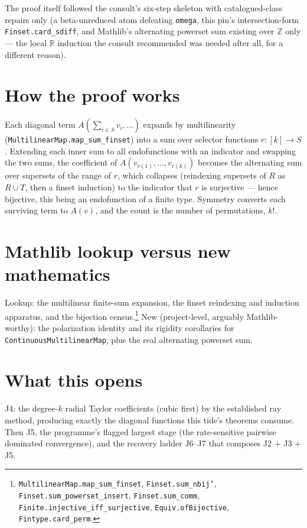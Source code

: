 \documentclass[11pt]{article}
\begin{document}
The proof itself followed the consult's six-step skeleton with
catalogued-class repairs only (a beta-unreduced atom defeating
\texttt{omega}, this pin's intersection-form
\texttt{Finset.card\_sdiff}, and Mathlib's alternating powerset sum
existing over $\mathbb{Z}$ only --- the local $\mathbb{R}$ induction
the consult recommended was needed after all, for a different
reason).

\section{How the proof works}

Each diagonal term $A(\sum_{i \in S} v_i, \dots)$ expands by
multilinearity (\texttt{MultilinearMap.map\_sum\_finset}) into a sum
over selector functions $r : [k] \to S$. Extending each inner sum to
all endofunctions with an indicator and swapping the two sums, the
coefficient of $A(v_{r(1)},\dots,v_{r(k)})$ becomes the alternating
sum over supersets of the range of $r$, which collapses (reindexing
supersets of $R$ as $R \cup T$, then a finset induction) to the
indicator that $r$ is surjective --- hence bijective, this being an
endofunction of a finite type. Symmetry converts each surviving term
to $A(v)$, and the count is the number of permutations, $k!$.

\section{Mathlib lookup versus new mathematics}

Lookup: the multilinear finite-sum expansion, the finset reindexing
and induction apparatus, and the bijection
census.\footnote{\texttt{MultilinearMap.map\_sum\_finset},
\texttt{Finset.sum\_nbij'}, \texttt{Finset.sum\_powerset\_insert},
\texttt{Finset.sum\_comm}, \texttt{Finite.injective\_iff\_surjective},
\texttt{Equiv.ofBijective}, \texttt{Fintype.card\_perm}.}
New (project-level, arguably Mathlib-worthy): the polarization
identity and its rigidity corollaries for
\texttt{ContinuousMultilinearMap}, plus the real alternating
powerset sum.

\section{What this opens}

J4: the degree-$k$ radial Taylor coefficients (cubic first) by the
established ray method, producing exactly the diagonal functions
this tide's theorems consume. Then J5, the programme's flagged
largest stage (the rate-sensitive pairwise dominated convergence),
and the recovery ladder J6--J7 that composes J2 + J3 + J5.
\end{document}
